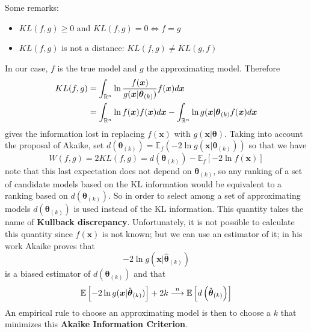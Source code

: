\begin{remark}
    Some remarks:
    \begin{itemize}
        \item $KL(f,g)\ge0$ and $KL(f,g)=0\iff f=g$
        \item $KL(f,g)$ is not a distance: $KL(f,g)\ne KL(g,f)$
    \end{itemize}
\end{remark}

In our case, $f$ is the true model and $g$ the approximating model. Therefore
\begin{equation*}
    \begin{split}
        KL(f,g)&=\int_{\mathbb{R}^n}\ln\frac{f(\boldsymbol{x})}{g(\boldsymbol{x}|\boldsymbol{\theta}_{(k)})}f(\boldsymbol{x})d\boldsymbol{x}\\
        &=\int_{\mathbb{R}^n}\ln f(\boldsymbol{x})f(\boldsymbol{x})d\boldsymbol{x}-\int_{\mathbb{R}^n}\ln g(\boldsymbol{x}|\boldsymbol{\theta}_{(k)}f(\boldsymbol{x})d\boldsymbol{x}\\
    \end{split}
\end{equation*}
gives the information lost in replacing $f(\boldsymbol{x})$ with $g(\boldsymbol{x}|\boldsymbol{\theta})$. Taking into account the proposal of Akaike, set $d(\boldsymbol{\theta}_{(k)})=\mathbb{E}_f(-2\ln g(\boldsymbol{x}|\boldsymbol{\theta}_{(k)}))$ so that we have
\[
    W(f,g)=2KL(f,g)=d(\boldsymbol{\theta}_{(k)})-\mathbb{E}_f[-2\ln f(\boldsymbol{x})]  
\]
note that this last expectation does not depend on $\boldsymbol{\theta}_{(k)}$, so any ranking of a set of candidate models based on the KL information would be equivalent to a ranking based on $d(\boldsymbol{\theta}_{(k)})$. So in order to select among a set of approximating models $d(\boldsymbol{\theta}_{(k)})$ is used instead of the KL information. This quantity takes the name of \textbf{Kullback discrepancy}. Unfortunately, it is not possible to calculate this quantity since $f(\boldsymbol{x})$ is not known; but we can use an estimator of it; in his work Akaike proves that
\[
    -2\ln g(\boldsymbol{x}|\hat{\boldsymbol{\theta}}_{(k)})  
\]
is a biased estimator of $d(\boldsymbol{\theta}_{(k)})$ and that 
\[
    \mathbb{E}\left[-2\ln g(\boldsymbol{x}|\hat{\boldsymbol{\theta}}_{(k)})\right]+2k\stackrel{n}{\longrightarrow}\mathbb{E}\left[d\left(\hat{\boldsymbol{\theta}}_{(k)}\right)\right]
\]
An empirical rule to choose an approximating model is then to choose a $k$ that minimizes this \textbf{Akaike Information Criterion}.


